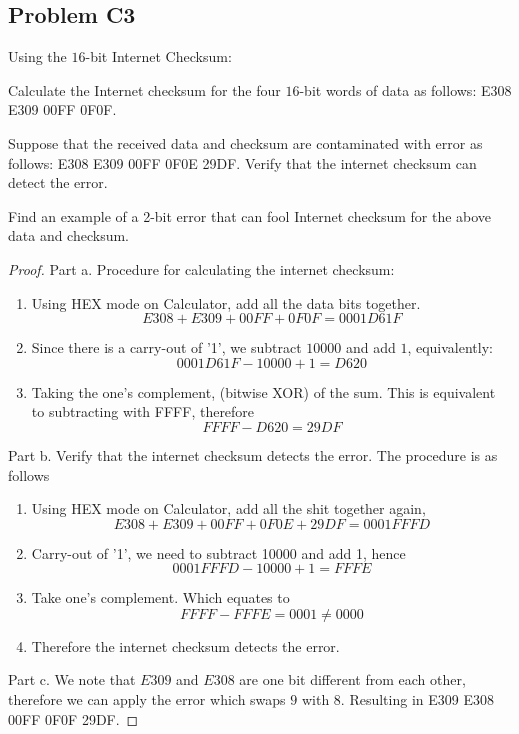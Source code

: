 \documentclass[../../../main.tex]{subfiles}
\begin{document}
\subsection{Problem C3}
\begin{wts}
    Using the $16$-bit Internet Checksum:
    \begin{enumalpha}
        \item Calculate the Internet checksum for the four $16$-bit words of data as follows: E308 E309 00FF 0F0F.
        \item Suppose that the received data and checksum are contaminated with error as follows: E308 E309 00FF 0F0E 29DF. Verify that the internet checksum can detect the error.
        \item Find an example of a 2-bit error that can fool Internet checksum for the above data and checksum.
    \end{enumalpha}
\end{wts}
\begin{proof}
Part a. Procedure for calculating the internet checksum:
\begin{enumerate}
    \item Using HEX mode on Calculator, add all the data bits together. 
    \[
    E308+E309+00FF+0F0F = 0001D61F
    \]
    \item Since there is a carry-out of '1', we subtract $10000$ and add $1$, equivalently:
    \[
    0001D61F - 10000 + 1 = D620
    \]
    \item Taking the one's complement, (bitwise XOR) of the sum. This is equivalent to subtracting with FFFF, therefore
    \[
    FFFF- D620 = 29DF
    \]
\end{enumerate}
Part b. Verify that the internet checksum detects the error. The procedure is as follows
\begin{enumerate}
    \item Using HEX mode on Calculator, add all the shit together again,
    \[
    E308+E309+00FF+0F0E+29DF = 0001FFFD
    \]
    \item Carry-out of '1', we need to subtract 10000 and add 1, hence
    \[
    0001FFFD - 10000 + 1 = FFFE
    \]
    \item Take one's complement. Which equates to
    \[
    FFFF-FFFE = 0001 \neq 0000
    \]
    \item Therefore the internet checksum detects the error.
\end{enumerate}
Part c. We note that $E309$ and $E308$ are one bit different from each other, therefore we can apply the error which swaps $9$ with $8$. Resulting in E309 E308 00FF 0F0F 29DF.

\end{proof}
\end{document}
